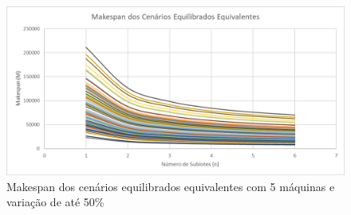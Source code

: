 \begin{figure}[!ht]
    \centering
    \includegraphics[width=12cm]{Resultados/Figuras/Meq05_50}
    \caption{Makespan dos cenários equilibrados equivalentes com 5 máquinas e variação de até 50\%}
    \label{fig:Meq05_50}
\end{figure}